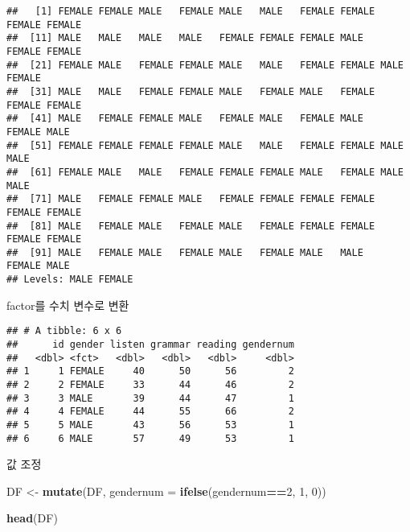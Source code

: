 \documentclass[
]{article}
\newenvironment{Shaded}{\begin{snugshade}}{\end{snugshade}}
\newcommand{\DataTypeTok}[1]{\textcolor[rgb]{0.13,0.29,0.53}{#1}}
\newcommand{\DecValTok}[1]{\textcolor[rgb]{0.00,0.00,0.81}{#1}}
\newcommand{\KeywordTok}[1]{\textcolor[rgb]{0.13,0.29,0.53}{\textbf{#1}}}
\newcommand{\NormalTok}[1]{#1}
\newcommand{\OperatorTok}[1]{\textcolor[rgb]{0.81,0.36,0.00}{\textbf{#1}}}
\newcommand{\StringTok}[1]{\textcolor[rgb]{0.31,0.60,0.02}{#1}}
\begin{document}
\begin{verbatim}
##   [1] FEMALE FEMALE MALE   FEMALE MALE   MALE   FEMALE FEMALE FEMALE FEMALE
##  [11] MALE   MALE   MALE   MALE   FEMALE FEMALE FEMALE MALE   FEMALE FEMALE
##  [21] FEMALE MALE   FEMALE FEMALE MALE   MALE   FEMALE FEMALE MALE   FEMALE
##  [31] MALE   MALE   FEMALE FEMALE MALE   FEMALE MALE   FEMALE FEMALE FEMALE
##  [41] MALE   FEMALE FEMALE MALE   FEMALE MALE   FEMALE MALE   FEMALE MALE  
##  [51] FEMALE FEMALE FEMALE FEMALE MALE   MALE   FEMALE FEMALE MALE   MALE  
##  [61] FEMALE MALE   MALE   FEMALE FEMALE FEMALE MALE   FEMALE MALE   MALE  
##  [71] MALE   FEMALE FEMALE MALE   FEMALE FEMALE FEMALE FEMALE FEMALE FEMALE
##  [81] MALE   FEMALE MALE   FEMALE MALE   FEMALE FEMALE FEMALE FEMALE FEMALE
##  [91] MALE   FEMALE MALE   FEMALE MALE   FEMALE MALE   MALE   FEMALE MALE  
## Levels: MALE FEMALE
\end{verbatim}

factor를 수치 변수로 변환

\begin{Shaded}
\end{Shaded}

\begin{verbatim}
## # A tibble: 6 x 6
##      id gender listen grammar reading gendernum
##   <dbl> <fct>   <dbl>   <dbl>   <dbl>     <dbl>
## 1     1 FEMALE     40      50      56         2
## 2     2 FEMALE     33      44      46         2
## 3     3 MALE       39      44      47         1
## 4     4 FEMALE     44      55      66         2
## 5     5 MALE       43      56      53         1
## 6     6 MALE       57      49      53         1
\end{verbatim}

값 조정

\begin{Shaded}
\begin{Highlighting}[]
\NormalTok{DF <-}\StringTok{ }\KeywordTok{mutate}\NormalTok{(DF, }\DataTypeTok{gendernum =} \KeywordTok{ifelse}\NormalTok{(gendernum}\OperatorTok{==}\DecValTok{2}\NormalTok{, }\DecValTok{1}\NormalTok{, }\DecValTok{0}\NormalTok{))}

\KeywordTok{head}\NormalTok{(DF)}
\end{Highlighting}
\end{Shaded}
\end{document}
